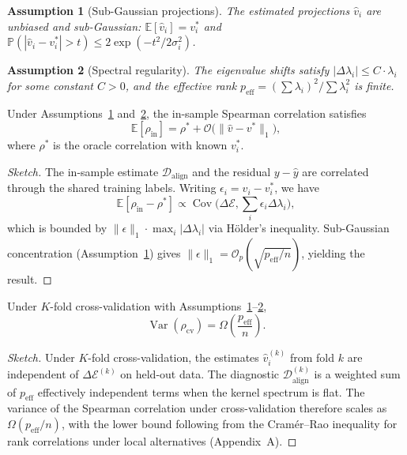 \documentclass[twoside,11pt]{article}
\newtheorem{assumption}{Assumption}
\begin{document}
\begin{assumption}[Sub-Gaussian projections]
\label{assum:proj}
The estimated projections $\hat{v}_i$ are unbiased and sub-Gaussian: $\mathbb{E}[\hat{v}_i] = v_i^*$ and $\mathbb{P}(|\hat{v}_i - v_i^*| > t) \leq 2\exp(-t^2 / 2\sigma_i^2)$.
\end{assumption}

\begin{assumption}[Spectral regularity]
\label{assum:spec}
The eigenvalue shifts satisfy $|\Delta\lambda_i| \leq C \cdot \lambda_i$ for some constant $C > 0$, and the effective rank $p_{\text{eff}} = (\sum \lambda_i)^2 / \sum \lambda_i^2$ is finite.
\end{assumption}

\begin{lemma}
\label{lem:bias}
Under Assumptions~\ref{assum:proj} and~\ref{assum:spec}, the in-sample Spearman correlation satisfies
\[
\mathbb{E}[\rho_{\text{in}}] = \rho^* + \mathcal{O}\bigl(\|\hat{v} - v^*\|_1\bigr),
\]
where $\rho^*$ is the oracle correlation with known $v_i^*$.
\end{lemma}

\begin{proof}[Sketch]
The in-sample estimate $\mathcal{D}_{\text{align}}$ and the residual $y - \hat{y}$ are correlated through the shared training labels. Writing $\epsilon_i = \hat{v}_i - v_i^*$, we have
\[
\mathbb{E}[\rho_{\text{in}} - \rho^*] \propto \operatorname{Cov}\bigl(\Delta\mathcal{E}, \textstyle\sum_i \epsilon_i \Delta\lambda_i\bigr),
\]
which is bounded by $\|\epsilon\|_1 \cdot \max_i |\Delta\lambda_i|$ via Hölder's inequality. Sub-Gaussian concentration (Assumption~\ref{assum:proj}) gives $\|\epsilon\|_1 = \mathcal{O}_p(\sqrt{p_{\text{eff}}/n})$, yielding the result.
\end{proof}

\begin{lemma}
\label{lem:var}
Under $K$-fold cross-validation with Assumptions~\ref{assum:proj}--\ref{assum:spec},
\[
\operatorname{Var}(\rho_{\text{cv}}) = \Omega\!\left(\frac{p_{\text{eff}}}{n}\right).
\]
\end{lemma}

\begin{proof}[Sketch]
Under $K$-fold cross-validation, the estimates $\hat{v}_i^{(k)}$ from fold $k$ are independent of $\Delta\mathcal{E}^{(k)}$ on held-out data. The diagnostic $\mathcal{D}_{\text{align}}^{(k)}$ is a weighted sum of $p_{\text{eff}}$ effectively independent terms when the kernel spectrum is flat. The variance of the Spearman correlation under cross-validation therefore scales as $\Omega(p_{\text{eff}}/n)$, with the lower bound following from the Cram\'er--Rao inequality for rank correlations under local alternatives (Appendix~A).
\end{proof}
\end{document}
